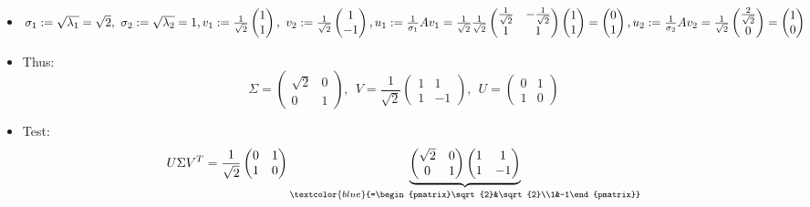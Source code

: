 {\begin{enumerate}
\begin{enumerate}
\begin{itemize}
\begin{enumerate}
\begin{align*}
				&\Leftrightarrow~~\tilde{v}_2=\begin{pmatrix}1\\-1\end{pmatrix}
				\end{align*}
			\end{enumerate}
			\item $\sigma_1:=\sqrt{\lambda_1}=\sqrt{2},~\sigma_2:=\sqrt{\lambda_2}=1,\\
			v_1:=\frac{1}{\sqrt{2}}\begin{pmatrix}1\\1\end{pmatrix},~v_2:=\frac{1}{\sqrt{2}}\begin{pmatrix}1\\-1\end{pmatrix},\\
			u_1:=\frac{1}{\sigma_1}Av_1=\frac{1}{\sqrt{2}}\frac{1}{\sqrt{2}}
			\begin{pmatrix}
			\frac{1}{\sqrt{2}}&-\frac{1}{\sqrt{2}}\\
			1&1
			\end{pmatrix}\begin{pmatrix}1\\1\end{pmatrix}=\begin{pmatrix}0\\1\end{pmatrix},\\
			u_2:=\frac{1}{\sigma_2}Av_2=\frac{1}{\sqrt{2}}\begin{pmatrix}\frac{2}{\sqrt{2}}\\0\end{pmatrix}=\begin{pmatrix}1\\0\end{pmatrix}$
			\item 
			Thus:
			$$
			\Sigma =\begin{pmatrix}\sqrt{2}&0\\0&1\end{pmatrix},~~
			V=\frac{1}{\sqrt{2}}\begin{pmatrix}1&1\\1&-1\end{pmatrix},~~
			U=\begin{pmatrix}0&1\\1&0\end{pmatrix}
			$$
			\item 
			Test:
			$$
			U\Sigma V^T
			=\frac{1}{\sqrt{2}}\begin{pmatrix}0&1\\1&0\end{pmatrix}\underbrace{\begin{pmatrix}\sqrt{2}&0\\0&1\end{pmatrix}\begin{pmatrix}1&1\\1&-1\end{pmatrix}}_{\textcolor{blue}{=\begin{pmatrix}\sqrt{2}&\sqrt{2}\\1&-1\end{pmatrix}}}
$$
\end{itemize}
\end{enumerate}
\end{enumerate}}
